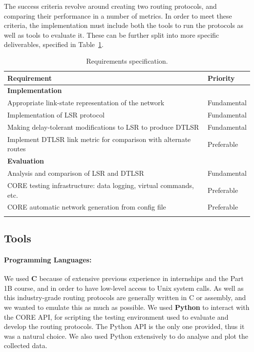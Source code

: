 \documentclass[withindex,glossary,openany]{cam-thesis}
\begin{document}
The success criteria revolve around creating two routing protocols, and comparing their performance in a number of metrics. In order to meet these criteria, the implementation must include both the tools to run the protocols as well as tools to evaluate it. These can be further split into more specific deliverables,
specified in Table~\ref{table:requirements}.

\begin{table}[H]
\centering
\begin{tabular}{@{}p{}l@{}}\toprule
\Large\textbf{Requirement} & \Large\textbf{Priority} \\
\midrule
\midrule
\textbf{Implementation} & \\
\midrule
Appropriate link-state representation of the network & Fundamental \\\addlinespace[0.2em]
Implementation of LSR protocol & Fundamental \\\addlinespace[0.2em]
Making delay-tolerant modifications to LSR to produce DTLSR & Fundamental \\\addlinespace[0.2em]
Implement DTLSR link metric for comparison with alternate routes & Preferable \\\addlinespace[0.2em]
\midrule
\midrule
\textbf{Evaluation} & \\
\midrule
Analysis and comparison of LSR and DTLSR & Fundamental \\\addlinespace[0.2em]
CORE testing infrastructure: data logging, virtual commands, etc. & Preferable \\\addlinespace[0.2em]
CORE automatic network generation from config file & Preferable \\\addlinespace[0.2em]
\bottomrule
\end{tabular}
\caption{Requirements specification.}
\label{table:requirements}
\end{table}

\subsection{Tools}

\paragraph{Programming Languages:}

We used \textbf{C} because of extensive previous experience in internships and the Part 1B course, and in order to have low-level access to Unix system calls. As well as this industry-grade routing protocols are generally written in C or assembly, and we wanted to emulate this as much as possible. We used \textbf{Python} to interact with the CORE API, for scripting the testing environment used to evaluate and develop the routing protocols. The Python API is the only one provided, thus it was a natural choice. We also used Python extensively to do analyse and plot the collected data.
\end{document}
